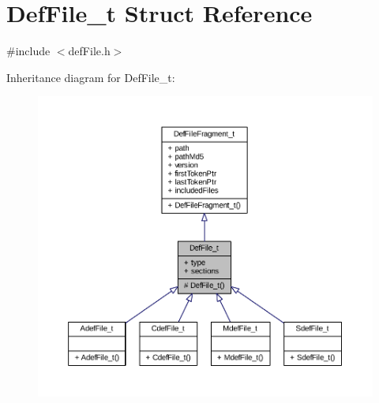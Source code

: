 \hypertarget{struct_def_file__t}{}\section{Def\+File\+\_\+t Struct Reference}
\label{struct_def_file__t}


{\ttfamily \#include $<$def\+File.\+h$>$}



Inheritance diagram for Def\+File\+\_\+t\+:
\nopagebreak
\begin{figure}[H]
\begin{center}
\leavevmode
\includegraphics[width=350pt]{struct_def_file__t__inherit__graph}
\end{center}
\end{figure}


